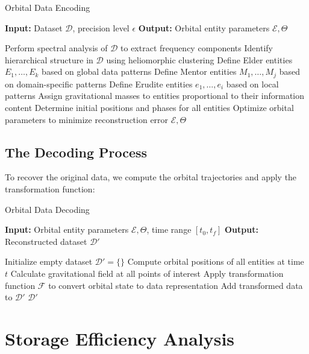 \begin{algorithm}[h]
\caption{Orbital Data Encoding}
\begin{algorithmic}[1]
\State \textbf{Input:} Dataset $\mathcal{D}$, precision level $\epsilon$
\State \textbf{Output:} Orbital entity parameters $\mathcal{E}, \Theta$

\State Perform spectral analysis of $\mathcal{D}$ to extract frequency components
\State Identify hierarchical structure in $\mathcal{D}$ using heliomorphic clustering
\State Define Elder entities $E_1, \ldots, E_k$ based on global data patterns
\State Define Mentor entities $M_1, \ldots, M_j$ based on domain-specific patterns
\State Define Erudite entities $e_1, \ldots, e_i$ based on local patterns
\State Assign gravitational masses to entities proportional to their information content
\State Determine initial positions and phases for all entities
\State Optimize orbital parameters to minimize reconstruction error 
\State \Return $\mathcal{E}, \Theta$
\end{algorithmic}
\end{algorithm}

\subsection{The Decoding Process}

To recover the original data, we compute the orbital trajectories and apply the transformation function:

\begin{algorithm}[h]
\caption{Orbital Data Decoding}
\begin{algorithmic}[1]
\State \textbf{Input:} Orbital entity parameters $\mathcal{E}, \Theta$, time range $[t_0, t_f]$
\State \textbf{Output:} Reconstructed dataset $\mathcal{D'}$

\State Initialize empty dataset $\mathcal{D'} = \{\}$
  \State Compute orbital positions of all entities at time $t$
  \State Calculate gravitational field at all points of interest
  \State Apply transformation function $\mathcal{F}$ to convert orbital state to data representation
  \State Add transformed data to $\mathcal{D'}$
\EndFor
\State \Return $\mathcal{D'}$
\end{algorithmic}
\end{algorithm}

\section{Storage Efficiency Analysis}


